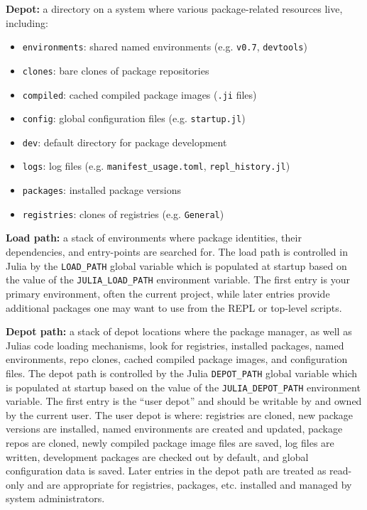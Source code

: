 \textbf{Depot:} a directory on a system where various package-related resources live, including:



\begin{itemize}
\item \texttt{environments}: shared named environments (e.g. \texttt{v0.7}, \texttt{devtools})


\item \texttt{clones}: bare clones of package repositories


\item \texttt{compiled}: cached compiled package images (\texttt{.ji} files)


\item \texttt{config}: global configuration files (e.g. \texttt{startup.jl})


\item \texttt{dev}: default directory for package development


\item \texttt{logs}: log files (e.g. \texttt{manifest\_usage.toml}, \texttt{repl\_history.jl})


\item \texttt{packages}: installed package versions


\item \texttt{registries}: clones of registries (e.g. \texttt{General})

\end{itemize}


\textbf{Load path:} a stack of environments where package identities, their dependencies, and entry-points are searched for. The load path is controlled in Julia by the \texttt{LOAD\_PATH} global variable which is populated at startup based on the value of the \texttt{JULIA\_LOAD\_PATH} environment variable. The first entry is your primary environment, often the current project, while later entries provide additional packages one may want to use from the REPL or top-level scripts.



\textbf{Depot path:} a stack of depot locations where the package manager, as well as Julia{\textquotesingle}s code loading mechanisms, look for registries, installed packages, named environments, repo clones, cached compiled package images, and configuration files. The depot path is controlled by the Julia \texttt{DEPOT\_PATH} global variable which is populated at startup based on the value of the \texttt{JULIA\_DEPOT\_PATH} environment variable. The first entry is the “user depot” and should be writable by and owned by the current user. The user depot is where: registries are cloned, new package versions are installed, named environments are created and updated, package repos are cloned, newly compiled package image files are saved, log files are written, development packages are checked out by default, and global configuration data is saved. Later entries in the depot path are treated as read-only and are appropriate for registries, packages, etc. installed and managed by system administrators.



